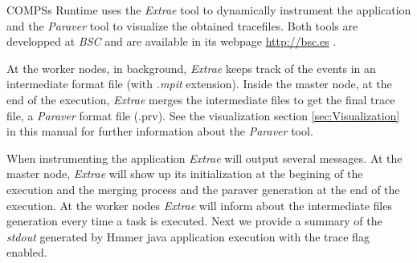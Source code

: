 COMPSs Runtime uses the \textit{Extrae} tool to dynamically instrument the application and the \textit{Paraver} tool to visualize
the obtained tracefiles. Both tools are developped at \textit{BSC} and are available in its webpage \url{http://bsc.es} . 

At the worker nodes, in background, \textit{Extrae} keeps track of the events in an intermediate format 
file (with \textit{.mpit} extension). Inside the master node, at the end of the execution, \textit{Extrae} merges the 
intermediate files to get the final trace file, a \textit{Paraver} format file (.prv). See the visualization 
section \ref{sec:Visualization} in this manual for further information about the \textit{Paraver} tool.

When instrumenting the application \textit{Extrae} will output several messages. At the master node, \textit{Extrae} will show up its
initialization at the begining of the execution and the merging process and the paraver generation at the end of the execution. At the
worker nodes \textit{Extrae} will inform about the intermediate files generation every time a task is executed. Next we provide a 
summary of the \textit{stdout} generated by Hmmer java application execution with the trace flag enabled. 
